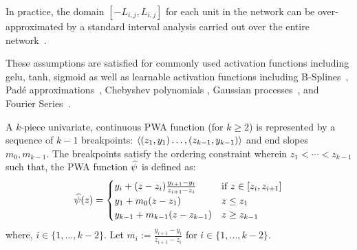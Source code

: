 In practice, the domain $[-L_{i,j}, L_{i,j}]$ for each unit in the network can be over-approximated by a standard interval analysis carried out over the entire network~\cite{DBLP:journals/corr/abs-1810-12715}. 

These assumptions are satisfied for commonly used activation functions including gelu, tanh, sigmoid as well as learnable activation functions including  B-Splines~\cite{Liu+Others/2025/KAN,torchkan}, Pad\'e approximations~\cite{afzal_2024}, Chebyshev polynomials \cite{ss_ar_r_kp_2024}, Gaussian processes~\cite{Chen/2024/Gaussian}, and Fourier Series~\cite{Xu+Others/2024/FourierKAN}.

\begin{definition}\label{def:cpwa-function}
A $k$-piece univariate, continuous PWA function (for $k \geq 2$) is represented by a sequence of $k-1$ breakpoints: $\left\langle (z_1,y_1) \ldots, (z_{k-1}, y_{k-1}) \right\rangle$ and end slopes $m_0, m_{k-1}$. The breakpoints satisfy the ordering constraint wherein $ z_1 <  \cdots < z_{k-1} $ such that, the PWA function $\widehat{\psi}$ is defined as:
\[ \psihat(z) = \begin{cases}
	y_i + (z - z_i)\frac{y_{i+1} - y_i}{z_{i+1} - z_i} &  \text{if}\ z \in [z_i, z_{i+1}] \\ 
    y_1 + m_0 (z - z_1) & z \leq z_1 \\ 
    y_{k-1} + m_{k-1} (z - z_{k-1}) & z \geq z_{k-1} \\ 
    \end{cases}
\]
where, $i \in \{ 1, \ldots, k-2\}$. Let $m_i := \frac{y_{i+1} - y_i}{z_{i+1} - z_i}$ for $i  \in \{ 1, \ldots, k-2\}$.
\end{definition}

